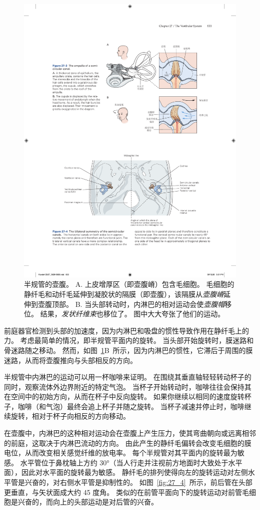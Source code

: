 \begin{figure}[htbp]
	\centering
	\includegraphics[width=0.89\linewidth]{chap27/fig_27_3}
	\caption{半规管的壶腹。
		A. 上皮增厚区（即壶腹嵴）包含毛细胞。
		毛细胞的静纤毛和动纤毛延伸到凝胶状的隔膜（即壶腹），该隔膜从\textit{壶腹嵴}延伸到壶腹顶部。
		B. 当头部转动时，内淋巴的相对运动会使\textit{壶腹帽}移位。
		结果，\textit{发状纤维束}也移位了。
		图中大大夸张了他们的运动。}
	\label{fig:27_3}
\end{figure}


前庭器官检测到头部的加速度，因为内淋巴和吸盘的惯性导致作用在静纤毛上的力。
考虑最简单的情况，即半规管平面内的旋转。
当头部开始旋转时，膜迷路和骨迷路随之移动。
然而，如图~\ref{fig:27_3}B~所示，因为内淋巴的惯性，它滞后于周围的膜迷路，从而将壶腹推向与头部相反的方向。


半规管中内淋巴的运动可以用一杯咖啡来证明。
在围绕其垂直轴轻轻转动杯子的同时，观察流体外边界附近的特定气泡。
当杯子开始转动时，咖啡往往会保持其在空间中的初始方向，从而在杯子中反向旋转。
如果你继续以相同的速度旋转杯子，咖啡（和气泡）最终会追上杯子并随之旋转。
当杯子减速并停止时，咖啡继续旋转，相对于杯子向相反的方向移动。


在壶腹中，内淋巴的这种相对运动会在壶腹上产生压力，使其弯曲朝向或远离相邻的前庭，这取决于内淋巴流动的方向。
由此产生的静纤毛偏转会改变毛细胞的膜电位，从而改变相关感觉纤维的放电率。
每个半规管对其平面内的旋转最为敏感。
水平管位于鼻枕轴上方约 30°（当人行走并注视前方地面时大致处于水平面），因此对水平面的旋转最为敏感。
静纤毛的排列使得向左的旋转运动对左侧水平管是兴奋的，对右侧水平管是抑制性的。
如图~\ref{fig:27_4}~所示，前后管在头部更垂直，与矢状面成大约 45 度角。 
类似的在前管平面向下的旋转运动对前管毛细胞是兴奋的，而向上的头部运动是对后管的兴奋。


